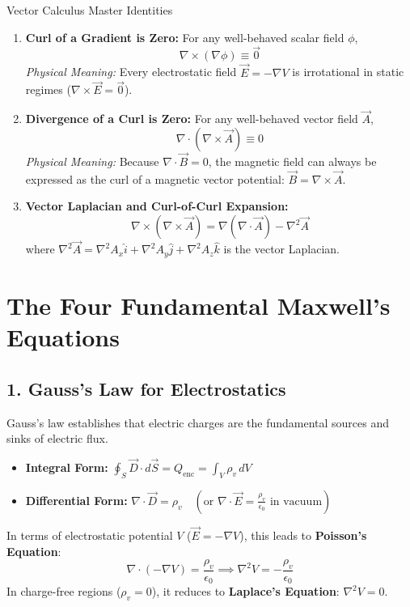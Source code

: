 \begin{derivbox}{Vector Calculus Master Identities}
\begin{enumerate}[leftmargin=*,itemsep=3pt]
    \item \textbf{Curl of a Gradient is Zero:} For any well-behaved scalar field $\phi$,
    \begin{equation}
    \nabla \times (\nabla \phi) \equiv \vec{0}
    \end{equation}
    \textit{Physical Meaning:} Every electrostatic field $\vec{E} = -\nabla V$ is irrotational in static regimes ($\nabla \times \vec{E} = \vec{0}$).
    \item \textbf{Divergence of a Curl is Zero:} For any well-behaved vector field $\vec{A}$,
    \begin{equation}
    \nabla \cdot (\nabla \times \vec{A}) \equiv 0
    \end{equation}
    \textit{Physical Meaning:} Because $\nabla \cdot \vec{B} = 0$, the magnetic field can always be expressed as the curl of a magnetic vector potential: $\vec{B} = \nabla \times \vec{A}$.
    \item \textbf{Vector Laplacian and Curl-of-Curl Expansion:}
    \begin{equation}
    \nabla \times (\nabla \times \vec{A}) = \nabla(\nabla \cdot \vec{A}) - \nabla^2 \vec{A}
    \end{equation}
    where $\nabla^2 \vec{A} = \nabla^2 A_x \hat{i} + \nabla^2 A_y \hat{j} + \nabla^2 A_z \hat{k}$ is the vector Laplacian.
\end{enumerate}
\end{derivbox}

\section{The Four Fundamental Maxwell's Equations}

\subsection{1. Gauss's Law for Electrostatics}
Gauss's law establishes that electric charges are the fundamental sources and sinks of electric flux.
\begin{itemize}[itemsep=2pt]
    \item \textbf{Integral Form:} $\oint_S \vec{D} \cdot d\vec{S} = Q_{\text{enc}} = \int_V \rho_v \, dV$
    \item \textbf{Differential Form:} $\nabla \cdot \vec{D} = \rho_v \quad (\text{or } \nabla \cdot \vec{E} = \frac{\rho_v}{\epsilon_0} \text{ in vacuum})$
\end{itemize}
In terms of electrostatic potential $V$ ($\vec{E} = -\nabla V$), this leads to \textbf{Poisson's Equation}:
\begin{equation}
\nabla \cdot (-\nabla V) = \frac{\rho_v}{\epsilon_0} \implies \nabla^2 V = -\frac{\rho_v}{\epsilon_0}
\end{equation}
In charge-free regions ($\rho_v = 0$), it reduces to \textbf{Laplace's Equation}: $\nabla^2 V = 0$.


